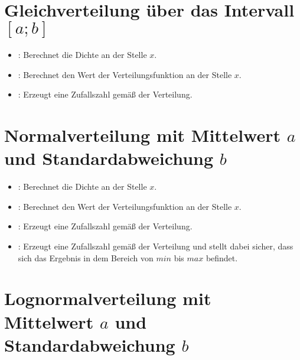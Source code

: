\section{Gleichverteilung über das Intervall \texorpdfstring{$[a;b]$}{[a;b]}}

\begin{itemize}

\item
{}:
Berechnet die Dichte an der Stelle $x$.

\item
{}:
Berechnet den Wert der Verteilungsfunktion an der Stelle $x$.

\item
{}:
Erzeugt eine Zufallszahl gemäß der Verteilung.

\end{itemize}



\section{Normalverteilung mit Mittelwert \texorpdfstring{$a$}{a} und Standardabweichung \texorpdfstring{$b$}{b}}

\begin{itemize}

\item
{}:
Berechnet die Dichte an der Stelle $x$.

\item
{}:
Berechnet den Wert der Verteilungsfunktion an der Stelle $x$.

\item
{}:
Erzeugt eine Zufallszahl gemäß der Verteilung.

\item
{}:
Erzeugt eine Zufallszahl gemäß der Verteilung und stellt dabei sicher, dass sich das Ergebnis in dem Bereich von $min$ bis $max$ befindet.

\end{itemize}



\section{Lognormalverteilung mit Mittelwert \texorpdfstring{$a$}{a} und Standardabweichung \texorpdfstring{$b$}{b}}

